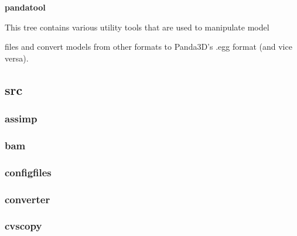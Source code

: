 \documentclass[a4paper]{article}
\begin{document}
\bigskip


\bigskip

{\centering\sffamily\bfseries
\hypertarget{RefHeading22511167907073}{}pandatool
\par}

{\centering\color{black}
This tree contains various utility tools that are used to manipulate model
\par}

{\centering\color{black}
files and convert models from other formats to Panda3D's .egg format (and vice versa).
\par}

\clearpage\subsection[src]{src}
\hypertarget{RefHeading22531167907073}{}\clearpage\subsubsection[assimp]{assimp}
\hypertarget{RefHeading22551167907073}{}\subsubsection{}
\clearpage\subsubsection[bam]{bam}
\hypertarget{RefHeading22571167907073}{}\subsubsection{}
\clearpage\subsubsection[configfiles]{configfiles}
\hypertarget{RefHeading22591167907073}{}\subsubsection{}
\clearpage\subsubsection[converter]{converter}
\hypertarget{RefHeading22611167907073}{}\subsubsection{}
\clearpage\subsubsection[cvscopy]{cvscopy}
\end{document}
